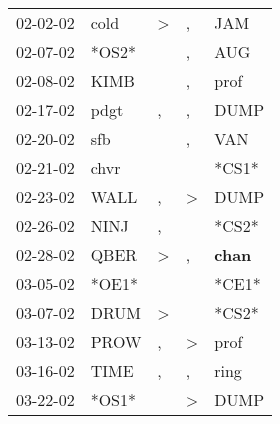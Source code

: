\begin{supertabular}{p{0.07\textwidth}p{0.06\textwidth}p{0.02\textwidth}p{0.02\textwidth}p{0.06\textwidth}}
          02-02-02\textsuperscript{} &           cold\textsuperscript{} &     \textgreater &                , &            JAM\textsuperscript{} \\
          02-07-02\textsuperscript{} &                            *OS2* &                  &                , &            AUG\textsuperscript{} \\
          02-08-02\textsuperscript{} &           KIMB\textsuperscript{} &                  &                , &           prof\textsuperscript{} \\
          02-17-02\textsuperscript{} &           pdgt\textsuperscript{} &                , &                , &           DUMP\textsuperscript{} \\
          02-20-02\textsuperscript{} &            sfb\textsuperscript{} &                  &                , &            VAN\textsuperscript{} \\
          02-21-02\textsuperscript{} &           chvr\textsuperscript{} &                  &                  &                            *CS1* \\
          02-23-02\textsuperscript{} &           WALL\textsuperscript{} &                , &     \textgreater &           DUMP\textsuperscript{} \\
          02-26-02\textsuperscript{} &           NINJ\textsuperscript{} &                , &                  &                            *CS2* \\
          02-28-02\textsuperscript{} &           QBER\textsuperscript{} &     \textgreater &                , &  \textbf{chan\textsuperscript{}} \\
          03-05-02\textsuperscript{} &                            *OE1* &                  &                  &                            *CE1* \\
          03-07-02\textsuperscript{} &           DRUM\textsuperscript{} &     \textgreater &                  &                            *CS2* \\
          03-13-02\textsuperscript{} &           PROW\textsuperscript{} &                , &     \textgreater &           prof\textsuperscript{} \\
          03-16-02\textsuperscript{} &           TIME\textsuperscript{} &                , &                , &           ring\textsuperscript{} \\
          03-22-02\textsuperscript{} &                            *OS1* &                  &     \textgreater &           DUMP\textsuperscript{} \\

\end{supertabular}
